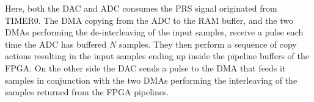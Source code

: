 Here, both the DAC and ADC consumes the PRS signal originated from TIMER0. The
DMA copying from the ADC to the RAM buffer, and the two DMAs performing the
de-interleaving of the input samples, receive a pulse each time the ADC has
buffered $N$ samples. They then perform a sequence of copy actions resulting
in the input samples ending up inside the pipeline buffers of the FPGA. On the
other side the DAC sends a pulse to the DMA that feeds it samples in conjunction
with the two DMAs performing the interleaving of the samples returned from the
FPGA pipelines.
